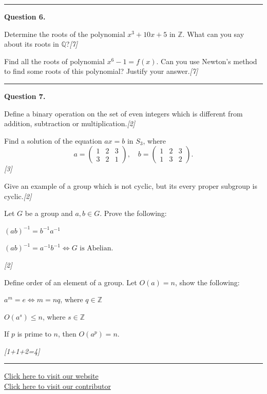 \documentclass[11pt,a4paper]{article}
\newcommand{\pts}[1]{\hfill   \textit{[#1]}}
\begin{document}
\medskip\rule{\linewidth}{0.2pt}\medskip




\noindent   \textbf{Question 6.}

\begin{parts}
  \item Determine the roots of the polynomial $x^3 + 10x + 5$ in $\mathbb{Z}$. What can you say about its roots in $\mathbb{Q}$?\pts{7}
  \item Find all the roots of polynomial $x^6 - 1 = f(x)$. Can you use Newton's method to find some roots of this polynomial? Justify your answer.\pts{7}
\end{parts}

\medskip\rule{\linewidth}{0.2pt}\medskip




\noindent   \textbf{Question 7.}

\begin{parts}
  \item Define a binary operation on the set of even integers which is different from addition, subtraction or multiplication.\pts{2}
  \item Find a solution of the equation $ax = b$ in $S_3$, where
  \[
    a = 
\begin{pmatrix} 1 & 2 & 3 \\ 3 & 2 & 1 \end{pmatrix}, \quad b = 
\begin{pmatrix} 1 & 2 & 3 \\ 1 & 3 & 2 \end{pmatrix}.
  \]\pts{3}
  \item Give an example of a group which is not cyclic, but its every proper subgroup is cyclic.\pts{2}
  \item Let $G$ be a group and $a, b \in G$. Prove the following:
  
\begin{parts}
    \item $(ab)^{-1} = b^{-1}a^{-1}$
    \item $(ab)^{-1} = a^{-1}b^{-1} \iff G  \text{ is Abelian}$.
  \end{parts}\pts{2}
  \item Define order of an element of a group. Let $O(a) = n$, show the following:
  
\begin{parts}
    \item $a^m = e \iff m = nq$, where $q \in \mathbb{Z}$
    \item $O(a^s) \le n$, where $s \in \mathbb{Z}$
    \item If $p$ is prime to $n$, then $O(a^p) = n$.
  \end{parts}\pts{1+1+2=4}
\end{parts}

\vfill
\rule{\linewidth}{0.4pt}

\begin{center}\small
\href{https://bhu-exam.vercel.app/}{Click here to visit our website}\\[4pt]
\href{https://me-aryan.vercel.app/}{Click here to visit our contributor}
\end{center}
\end{document}
